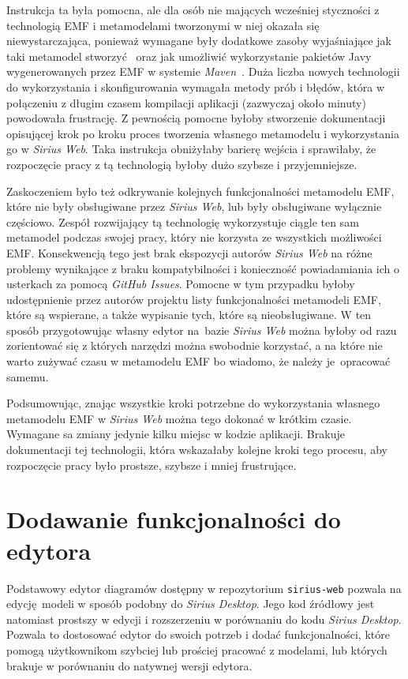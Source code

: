 Instrukcja ta była pomocna, ale dla osób nie mających wcześniej styczności z
technologią \gls{EMF} i metamodelami tworzonymi w niej okazała się
niewystarczająca, ponieważ wymagane były dodatkowe zasoby wyjaśniające jak taki
metamodel stworzyć~\cite{dokumentacja-sirius-desktop,dokumentacja-aql} oraz jak
umożliwić wykorzystanie pakietów Javy wygenerowanych przez \gls{EMF} w systemie
\emph{Maven}~\cite{maven-tycho-tutorial}.
Duża liczba nowych technologii do wykorzystania i skonfigurowania wymagała
metody prób i błędów, która w połączeniu z długim czasem kompilacji aplikacji
(zazwyczaj około minuty) powodowała frustrację. Z pewnością pomocne byłoby
stworzenie dokumentacji opisującej krok po kroku proces tworzenia własnego
metamodelu i wykorzystania go w \emph{Sirius Web}. Taka instrukcja obniżyłaby
barierę wejścia i sprawiłaby, że rozpoczęcie pracy z tą technologią byłoby dużo
szybsze i przyjemniejsze.

Zaskoczeniem było też odkrywanie kolejnych funkcjonalności metamodelu
\gls{EMF}, które nie były obsługiwane przez \emph{Sirius Web}, lub były
obsługiwane wyłącznie częściowo. Zespół rozwijający tą technologię wykorzystuje
ciągle ten sam metamodel podczas swojej pracy, który nie korzysta ze
wszystkich możliwości \gls{EMF}. Konsekwencją tego jest brak ekspozycji autorów
\emph{Sirius Web} na różne problemy wynikające z braku kompatybilności i
konieczność powiadamiania ich o usterkach za pomocą \emph{GitHub Issues}.
Pomocne w tym przypadku byłoby udostępnienie przez autorów projektu listy
funkcjonalności metamodeli \gls{EMF}, które są wspierane, a także wypisanie
tych, które są nieobsługiwane. W ten sposób przygotowując własny edytor
na~bazie
\emph{Sirius Web} można byłoby od razu zorientować się z których narzędzi można
swobodnie korzystać, a na które nie warto zużywać czasu w metamodelu \gls{EMF}
bo wiadomo, że należy je~opracować samemu.

Podsumowując, znając wszystkie kroki potrzebne do wykorzystania własnego
metamodelu \gls{EMF} w \emph{Sirius Web} można tego dokonać w krótkim czasie.
Wymagane sa zmiany jedynie kilku miejsc w kodzie aplikacji. Brakuje
dokumentacji tej technologii, która wskazałaby kolejne kroki tego
procesu, aby rozpoczęcie pracy było prostsze, szybsze i mniej frustrujące.

\section{Dodawanie funkcjonalności do edytora}

Podstawowy edytor diagramów dostępny w repozytorium \texttt{sirius-web}
pozwala na edycję modeli w sposób podobny do \emph{Sirius Desktop}.
Jego kod źródłowy jest natomiast prostszy w edycji i rozszerzeniu w porównaniu
do kodu \emph{Sirius Desktop}. Pozwala to dostosować edytor do swoich potrzeb i
dodać funkcjonalności, które pomogą użytkownikom szybciej lub prościej pracować
z modelami, lub których brakuje w porównaniu do natywnej wersji edytora.

